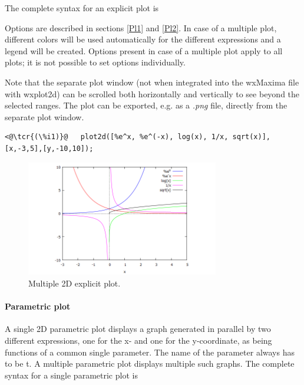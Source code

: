 \documentclass[../Maxima_Workbook.tex]{subfiles}
\begin{document}
\lzz The complete syntax for an explicit plot is

\lz {}

\lz Options are described in sections \ref{Pl1} and \ref{Pl2}. In case of a multiple plot, different colors will be used automatically for the different expressions and a legend will be created. Options present in case of a multiple plot apply to all plots; it is not possible to set options individually.

\lz Note that the separate plot window (not when integrated into the wxMaxima file with wxplot2d) can be scrolled both horizontally and vertically to see beyond the selected ranges. The plot can be exported, e.g. as a \emph{.png} file, directly from the separate plot window.

\lz \begin{lstlisting}
<@\tcr{(\%i1)}@   plot2d([%e^x, %e^(-x), log(x), 1/x, sqrt(x)],[x,-3,5],[y,-10,10]);
\end{lstlisting}
\vspace{-2mm} 

\begin{figure}
	\centering
	\includegraphics[width=0.75\textwidth]{Pl_explicit_plot2d.png}
	\caption{Multiple 2D explicit plot.}
	\label{Pl-Fig1}
\end{figure}

\paragraph{Parametric plot} \mbox{}

\lz A single 2D parametric plot displays a graph generated in parallel by two different expressions, one for the x- and one for the y-coordinate, as being functions of a common single parameter. The name of the parameter always has to be t. A multiple parametric plot displays multiple such graphs. The complete syntax for a single parametric plot is
\end{document}
